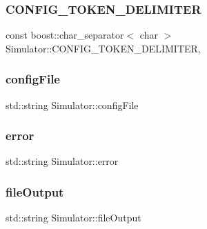 \subsubsection{\texorpdfstring{C\+O\+N\+F\+I\+G\+\_\+\+T\+O\+K\+E\+N\+\_\+\+D\+E\+L\+I\+M\+I\+T\+ER}{CONFIG\_TOKEN\_DELIMITER}}
{\footnotesize\ttfamily const boost\+::char\+\_\+separator$<$ char $>$ Simulator\+::\+C\+O\+N\+F\+I\+G\+\_\+\+T\+O\+K\+E\+N\+\_\+\+D\+E\+L\+I\+M\+I\+T\+ER\hspace{0.3cm}{\ttfamily [static]}, {\ttfamily [private]}}

\hypertarget{class_simulator_a7ef7a1e509bc344a6da592b979a7a09d}{}\label{class_simulator_a7ef7a1e509bc344a6da592b979a7a09d} 
\subsubsection{\texorpdfstring{config\+File}{configFile}}
{\footnotesize\ttfamily std\+::string Simulator\+::config\+File\hspace{0.3cm}{\ttfamily [private]}}

\hypertarget{class_simulator_ac5b8100ebe53ef360a973a4fb4891019}{}\label{class_simulator_ac5b8100ebe53ef360a973a4fb4891019} 
\subsubsection{\texorpdfstring{error}{error}}
{\footnotesize\ttfamily std\+::string Simulator\+::error\hspace{0.3cm}{\ttfamily [private]}}

\hypertarget{class_simulator_ae1327302343c01ea0e127bd3486a7780}{}\label{class_simulator_ae1327302343c01ea0e127bd3486a7780} 
\subsubsection{\texorpdfstring{file\+Output}{fileOutput}}
{\footnotesize\ttfamily std\+::string Simulator\+::file\+Output\hspace{0.3cm}{\ttfamily [private]}}

\hypertarget{class_simulator_ad9769c8acac3f878df047f28456d0082}{}\label{class_simulator_ad9769c8acac3f878df047f28456d0082} 
